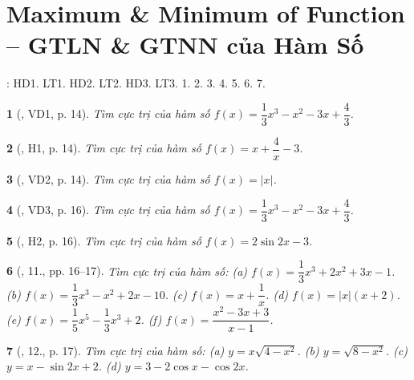 \documentclass{article}
\newtheorem{baitoan}{}
\begin{document}

\section{Maximum \& Minimum of Function -- GTLN \& GTNN của Hàm Số}
\cite[Chap. I, \S2, pp. 15--20]{SGK_Toan_12_CD_tap_1}: HD1. LT1. HD2. LT2. HD3. LT3. 1. 2. 3. 4. 5. 6. 7.

\begin{baitoan}[\cite{SGK_Toan_12_giai_tich_nang_cao}, VD1, p. 14]
	Tìm cực trị của hàm số $f(x) = \dfrac{1}{3}x^3 - x^2 - 3x + \dfrac{4}{3}$.
\end{baitoan}

\begin{baitoan}[\cite{SGK_Toan_12_giai_tich_nang_cao}, H1, p. 14]
	Tìm cực trị của hàm số $f(x) = x + \dfrac{4}{x} - 3$.
\end{baitoan}

\begin{baitoan}[\cite{SGK_Toan_12_giai_tich_nang_cao}, VD2, p. 14]
	Tìm cực trị của hàm số $f(x) = |x|$.
\end{baitoan}

\begin{baitoan}[\cite{SGK_Toan_12_giai_tich_nang_cao}, VD3, p. 16]
	Tìm cực trị của hàm số $f(x) = \dfrac{1}{3}x^3 - x^2 - 3x + \dfrac{4}{3}$.
\end{baitoan}

\begin{baitoan}[\cite{SGK_Toan_12_giai_tich_nang_cao}, H2, p. 16]
	Tìm cực trị của hàm số $f(x) = 2\sin2x - 3$.
\end{baitoan}

\begin{baitoan}[\cite{SGK_Toan_12_giai_tich_nang_cao}, 11., pp. 16--17]
	Tìm cực trị của hàm số: (a) $f(x) = \dfrac{1}{3}x^3 + 2x^2 + 3x - 1$. (b) $f(x) = \dfrac{1}{3}x^3 - x^2 + 2x - 10$. (c) $f(x) = x + \dfrac{1}{x}$. (d) $f(x) = |x|(x + 2)$. (e) $f(x) = \dfrac{1}{5}x^5 - \dfrac{1}{3}x^3 + 2$. (f) $f(x) = \dfrac{x^2 - 3x + 3}{x - 1}$.
\end{baitoan}

\begin{baitoan}[\cite{SGK_Toan_12_giai_tich_nang_cao}, 12., p. 17]
	Tìm cực trị của hàm số: (a) $y = x\sqrt{4 - x^2}$. (b) $y = \sqrt{8 - x^2}$. (c) $y = x - \sin2x + 2$. (d) $y = 3 - 2\cos x - \cos2x$.
\end{baitoan}
\end{document}
